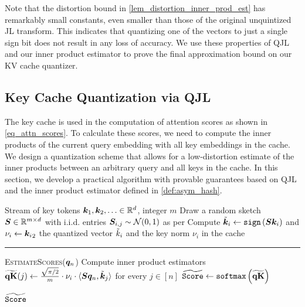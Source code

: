 \documentclass[11pt]{article}
\theoremstyle{plain}
\theoremstyle{definition}
\theoremstyle{remark}
\let\norm\relax
\newcommand{\norm}[1]{\|#1\|}
\begin{document}
Note that the distortion bound in \cref{lem_distortion_inner_prod_est} has remarkably small constants, even smaller than those of the original unquintized JL transform. 
This indicates that quantizing one of the vectors to just a single sign bit does not result in any loss of accuracy.
We use these properties of QJL and our inner product estimator to prove the final approximation bound on our KV cache quantizer.


\subsection{Key Cache Quantization via QJL}
The key cache is used in the computation of attention scores as shown in \cref{eq_attn_scores}.
To calculate these scores, we need to compute the inner products of the current query embedding with all key embeddings in the cache.
We design a quantization scheme that allows for a low-distortion estimate of the inner products between an arbitrary query and all keys in the cache.
In this section, we develop a practical algorithm with provable guarantees based on QJL and the inner product estimator defined in \cref{def:asym_hash}.

\begin{algorithm}[t]
\caption{\textsc{QJL} Key Cache Quantizer}
    \begin{algorithmic}[1]
    \Require Stream of key tokens $\k_1, \k_2, \ldots \in \mathbb{R}^d$, integer $m$
    \State Draw a random sketch $\S \in \RR^{m \times d}$ with i.i.d. entries $\S_{i,j} \sim \mathcal{N}(0, 1)$ as per 
    \Repeat
    \State Compute $\Tilde{\k}_i \gets {\tt sign}\left( \S \k_i \right)$ and $\nu_i \gets \norm{\k_i}_2$
     the quantized vector $\Tilde{k}_i$ and the key norm $\nu_i$ in the cache
    \vspace{1mm} \hrule \vspace{1mm}
    \hspace*{-1.4cm}{\bf Procedure} \textsc{EstimateScores}($\q_n$)  
    \State Compute inner product estimators $\widetilde{{\bf qK}}(j) \gets \frac{\sqrt{\pi/2}}{m} \cdot \nu_i \cdot \langle \S \q_n, \Tilde{\k}_j \rangle$ for every $j \in [n]$
    \State $\widetilde{\tt Score} \gets {\tt softmax}\left( \widetilde{{\bf qK}} \right)$
    
    \hspace*{-1.4cm}{\bf return} $\widetilde{\tt Score}$
    \end{algorithmic}
\label{alg:qjl}
\end{algorithm}
\end{document}
